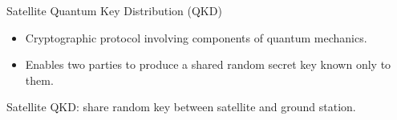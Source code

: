 \begin{frame}{Satellite Quantum Key Distribution (QKD)}
    
    \begin{overprint}
        \begin{itemize}
            \item Cryptographic protocol involving components of quantum mechanics.
            \item Enables two parties to produce a shared random secret key known only to them.
        \end{itemize}
        Satellite QKD: share random key between satellite and ground station.
    \end{overprint}
    
        
    
\end{frame}

